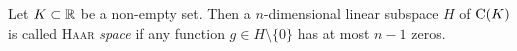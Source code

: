 \begin{definition}
Let $K\subset \mathbb{R}$ be a non-empty set. Then a $n$-dimensional linear subspace $H$ of $\operatorname{C}(K)$ is called \textsc{Haar} \emph{space} if any function $g\in H\setminus\{0\}$ has at most $n-1$ zeros.
\end{definition}
